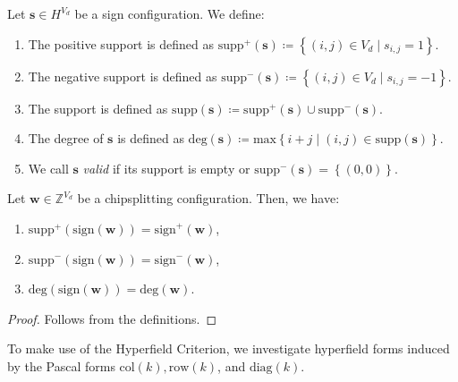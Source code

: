 \begin{definition}
    Let \( \mathbf{s} \in H^{V_d} \) be a sign configuration. We define:
    \begin{enumerate}
        \item The positive support is defined as \( \mathrm{supp}^+(\mathbf{s}) \coloneqq \left\{ (i,j) \in V_d \mid s_{i,j} = 1 \right\} \).
        \item The negative support is defined as \( \mathrm{supp}^-(\mathbf{s}) \coloneqq \left\{ (i,j) \in V_d \mid s_{i,j} = -1 \right\} \).
        \item The support is defined as \( \mathrm{supp}(\mathbf{s}) \coloneqq \mathrm{supp}^+(\mathbf{s}) \cup \mathrm{supp}^-(\mathbf{s}) \).
        \item The degree of \( \mathbf{s} \) is defined as \( \mathrm{deg}(\mathbf{s}) \coloneqq \mathrm{max}\left\{ i + j \mid (i,j) \in \mathrm{supp}(\mathbf{s}) \right\} \).
        \item We call \( \mathbf{s} \) \emph{valid} if its support is empty or \( \mathrm{supp}^-(\mathbf{s}) = \left\{ (0,0) \right\} \).
    \end{enumerate}
\end{definition}

\begin{lemma}
    Let \( \mathbf{w} \in \mathbb{Z}^{V_d} \) be a chipsplitting configuration. Then, we have:
    \begin{enumerate}
        \item \( \mathrm{supp}^+(\mathrm{sign}(\mathbf{w})) = \mathrm{sign}^+(\mathbf{w}) \),
        \item \( \mathrm{supp}^-(\mathrm{sign}(\mathbf{w})) = \mathrm{sign}^-(\mathbf{w}) \),
        \item \( \mathrm{deg}(\mathrm{sign}(\mathbf{w})) = \mathrm{deg}(\mathbf{w}) \).
    \end{enumerate}
\end{lemma}

\begin{proof}
    Follows from the definitions.
\end{proof}

To make use of the Hyperfield Criterion, we investigate hyperfield forms induced by the Pascal forms \( \mathrm{col}(k), \mathrm{row}(k) \), and \( \mathrm{diag}(k) \).

